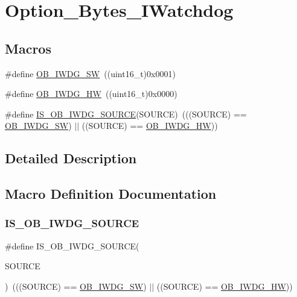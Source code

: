 \hypertarget{group___option___bytes___i_watchdog}{}\section{Option\+\_\+\+Bytes\+\_\+\+I\+Watchdog}
\label{group___option___bytes___i_watchdog}
\subsection*{Macros}
\begin{DoxyCompactItemize}
\item 
\#define \mbox{\hyperlink{group___option___bytes___i_watchdog_ga5a357e232c955444c3f2ccb9a937ffce}{O\+B\+\_\+\+I\+W\+D\+G\+\_\+\+SW}}~((uint16\+\_\+t)0x0001)
\item 
\#define \mbox{\hyperlink{group___option___bytes___i_watchdog_gadfcbfa963d79c339ec8e2d5a7734e47a}{O\+B\+\_\+\+I\+W\+D\+G\+\_\+\+HW}}~((uint16\+\_\+t)0x0000)
\item 
\#define \mbox{\hyperlink{group___option___bytes___i_watchdog_gaf2871652c08e76499d9449be6556f12c}{I\+S\+\_\+\+O\+B\+\_\+\+I\+W\+D\+G\+\_\+\+S\+O\+U\+R\+CE}}(S\+O\+U\+R\+CE)~(((S\+O\+U\+R\+CE) == \mbox{\hyperlink{group___option___bytes___i_watchdog_ga5a357e232c955444c3f2ccb9a937ffce}{O\+B\+\_\+\+I\+W\+D\+G\+\_\+\+SW}}) $\vert$$\vert$ ((S\+O\+U\+R\+CE) == \mbox{\hyperlink{group___option___bytes___i_watchdog_gadfcbfa963d79c339ec8e2d5a7734e47a}{O\+B\+\_\+\+I\+W\+D\+G\+\_\+\+HW}}))
\end{DoxyCompactItemize}


\subsection{Detailed Description}


\subsection{Macro Definition Documentation}
\mbox{\label{group___option___bytes___i_watchdog_gaf2871652c08e76499d9449be6556f12c}} 
\subsubsection{\texorpdfstring{IS\_OB\_IWDG\_SOURCE}{IS\_OB\_IWDG\_SOURCE}}
{\footnotesize\ttfamily \#define I\+S\+\_\+\+O\+B\+\_\+\+I\+W\+D\+G\+\_\+\+S\+O\+U\+R\+CE(\begin{DoxyParamCaption}\item[{}]{S\+O\+U\+R\+CE }\end{DoxyParamCaption})~(((S\+O\+U\+R\+CE) == \mbox{\hyperlink{group___option___bytes___i_watchdog_ga5a357e232c955444c3f2ccb9a937ffce}{O\+B\+\_\+\+I\+W\+D\+G\+\_\+\+SW}}) $\vert$$\vert$ ((S\+O\+U\+R\+CE) == \mbox{\hyperlink{group___option___bytes___i_watchdog_gadfcbfa963d79c339ec8e2d5a7734e47a}{O\+B\+\_\+\+I\+W\+D\+G\+\_\+\+HW}}))}

